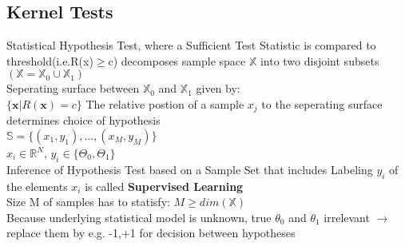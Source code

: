 \begin{sectionbox}
	\subsection{Kernel Tests}
Statistical Hypothesis Test, where a Sufficient Test Statistic is compared to threshold(i.e.R(x)$\geq$c) decomposes sample space $\mathbb{X}$ into two disjoint subsets$(\mathbb{X}=\mathbb{X}_0\cup\mathbb{X}_1)$ \\
Seperating surface between $\mathbb{X}_0$ and $\mathbb{X}_1$ given by:\\
$\{\mathbf{x}|R(\mathbf{x})=c\}$
The relative postion of a sample $x_j$ to the seperating surface determines choice of hypothesis\\
$\boxed{\mathbb{S} = \{(x_1, y_1),...,(x_M, y_M)\}}$ %
\\
$x_i \in \mathbb{R}^N$, $y_i \in \{\Theta_0, \Theta_1\}$ \\
Inference of Hypothesis Test based on a Sample Set that includes Labeling $y_i$ of the elements $x_i$ is called \textbf{Supervised Learning} \\
Size M of samples has to statisfy:
$\boxed{M \geq dim(\mathbb{X})}$ \\
Because underlying statistical model is unknown, true $\theta_{0}$ and $\theta_{1}$ irrelevant $\rightarrow$ replace them by e.g. {-1,+1} for decision between hypotheses
\end{sectionbox}


